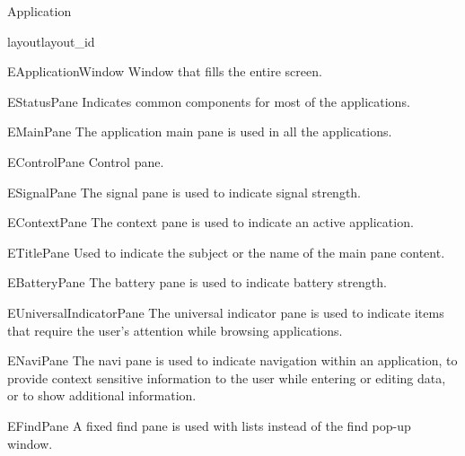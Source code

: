 \begin{classdesc*}{Application}
\begin{methoddesc}[Application]{layout}{layout_id}
\begin{datadesc}{EApplicationWindow} 
 Window that fills the entire screen.
\end{datadesc}

\begin{datadesc}{EStatusPane} 
Indicates common components for most of the applications.  
\end{datadesc}

\begin{datadesc}{EMainPane} 
The application main pane is used in all the applications.  
\end{datadesc}

\begin{datadesc}{EControlPane} 
Control pane.
\end{datadesc}

\begin{datadesc}{ESignalPane} 
The signal pane is used to indicate signal strength.  
\end{datadesc}

\begin{datadesc}{EContextPane} 
The context pane is used to indicate an active application.
\end{datadesc}

\begin{datadesc}{ETitlePane} 
Used to indicate the subject or the name of the main pane content. 
\end{datadesc}

\begin{datadesc}{EBatteryPane} 
The battery pane is used to indicate battery strength.  
\end{datadesc}

\begin{datadesc}{EUniversalIndicatorPane} 
The universal indicator pane is used to indicate items that require the user's 
attention while browsing applications. 
\end{datadesc}

\begin{datadesc}{ENaviPane} 
The navi pane is used to indicate navigation within an application, to provide 
context sensitive information to the user while entering or editing data, or to 
show additional information.  
\end{datadesc}

\begin{datadesc}{EFindPane} 
A fixed find pane is used with lists instead of the find pop-up window.  
\end{datadesc}


\end{methoddesc}
\end{classdesc*}
